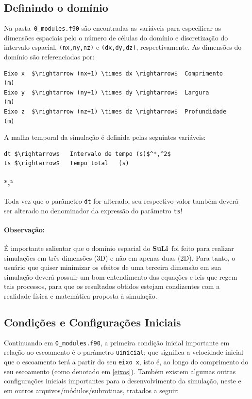 \documentclass[12pt, a4paper]{article}
\newcommand{\SL}{{\bf SuLi}}
\begin{document}

\subsection{Definindo o domínio}

Na pasta \,\verb|0_modules.f90| são encontradas as variáveis para especificar as dimensões espaciais pelo o número de células do domínio e discretização do intervalo espacial, \verb|(nx,ny,nz)| e \verb|(dx,dy,dz)|, respectivamente. As dimensões do domínio são referenciadas por:
\begin{lstlisting}
Eixo x	$\rightarrow (nx+1) \times dx \rightarrow$  Comprimento		(m)
Eixo y  $\rightarrow (ny+1) \times dy \rightarrow$  Largura			  (m)
Eixo z	$\rightarrow (nz+1) \times dz \rightarrow$  Profundidade	(m)
\end{lstlisting}	\label{eixos}

A malha temporal da simulação é definida pelas seguintes variáveis:
\begin{lstlisting}
dt $\rightarrow$   Intervalo de tempo (s)$^*,^2$
ts $\rightarrow$   Tempo total	 (s)
\end{lstlisting}

\paragraph{*,²} Toda vez que o parâmetro \verb|dt| for alterado, seu respectivo valor também deverá ser alterado no denominador da expressão do parâmetro \verb|ts|!

\paragraph{Observação:} É importante salientar que o domínio espacial do \SL\ foi feito para realizar simulações em três dimensões (3D) e não em apenas duas (2D). Para tanto, o usuário que quiser minimizar os efeitos de uma terceira dimensão em sua simulação deverá possuir um bom entendimento das equações e leis que regem tais processos, para que os resultados obtidos estejam condizentes com a realidade física e matemática proposta à simulação.



\subsection{Condições e Configurações Iniciais}
Continuando em \verb|0_modules.f90|, a primeira condição inicial importante em relação ao escoamento é o parâmetro \verb|uinicial|; que significa a velocidade inicial que o escoamento terá a partir do seu \verb|eixo x|, isto é, ao longo do comprimento do seu escoamento (como denotado em \ref{eixos}). Também existem algumas outras configurações iniciais importantes para o desenvolvimento da simulação, neste e em outros arquivos/módulos/subrotinas, tratados a seguir:
\end{document}

